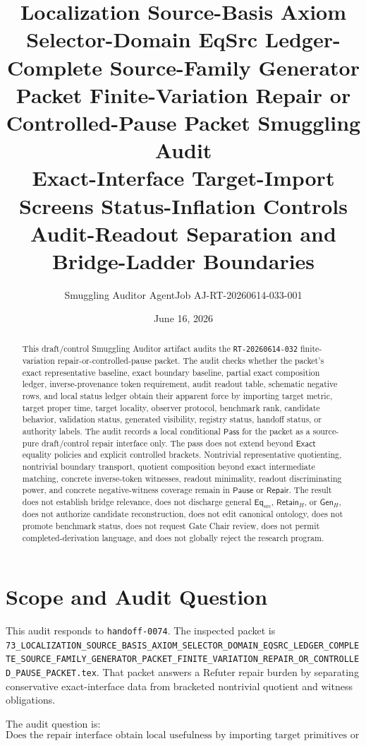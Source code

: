 \documentclass[11pt]{article}
\title{\textbf{Localization Source-Basis Axiom Selector-Domain EqSrc Ledger-Complete Source-Family Generator Packet Finite-Variation Repair or Controlled-Pause Packet Smuggling Audit}\\[0.35em]
\large Exact-Interface Target-Import Screens Status-Inflation Controls Audit-Readout Separation and Bridge-Ladder Boundaries}
\author{Smuggling Auditor AgentJob AJ-RT-20260614-033-001}
\date{June 16, 2026}
\newcommand{\EqSrc}{\mathsf{Eq}_{\mathrm{src}}}
\newcommand{\RetainH}{\mathsf{Retain}_{H}}
\newcommand{\GenH}{\mathsf{Gen}_{H}}
\newcommand{\Pass}{\mathsf{Pass}}
\newcommand{\Pause}{\mathsf{Pause}}
\newcommand{\Repair}{\mathsf{Repair}}
\newcommand{\Exact}{\mathsf{Exact}}
\begin{document}
\maketitle

\begin{abstract}
This draft/control Smuggling Auditor artifact audits the
\texttt{RT-20260614-032} finite-variation repair-or-controlled-pause
packet. The audit checks whether the packet's exact representative
baseline, exact boundary baseline, partial exact composition ledger,
inverse-provenance token requirement, audit readout table, schematic
negative rows, and local status ledger obtain their apparent force by
importing target metric, target proper time, target locality, observer
protocol, benchmark rank, candidate behavior, validation status,
generated visibility, registry status, handoff status, or authority
labels. The audit records a local conditional \(\Pass\) for the
packet as a source-pure draft/control repair interface only. The pass
does not extend beyond \(\Exact\) equality policies and explicit
controlled brackets. Nontrivial representative quotienting,
nontrivial boundary transport, quotient composition beyond exact
intermediate matching, concrete inverse-token witnesses, readout
minimality, readout discriminating power, and concrete negative-witness
coverage remain in \(\Pause\) or \(\Repair\). The result does not
establish bridge relevance, does not discharge general \(\EqSrc\),
\(\RetainH\), or \(\GenH\), does not authorize candidate
reconstruction, does not edit canonical ontology, does not promote
benchmark status, does not request Gate Chair review, does not permit
completed-derivation language, and does not globally reject the
research program.
\end{abstract}

\section{Scope and Audit Question}

This audit responds to \texttt{handoff-0074}. The inspected packet is
\texttt{73\_LOCALIZATION\_SOURCE\_BASIS\_AXIOM\_SELECTOR\_DOMAIN\_EQSRC\_LEDGER\_COMPLETE\_SOURCE\_FAMILY\_GENERATOR\_PACKET\_FINITE\_VARIATION\_REPAIR\_OR\_CONTROLLED\_PAUSE\_PACKET.tex}.
That packet answers a Refuter repair burden by separating conservative
exact-interface data from bracketed nontrivial quotient and witness
obligations.

The audit question is:
\[
    \text{Does the repair interface obtain local usefulness by
    importing target primitives or authority labels?}
\]
\end{document}
